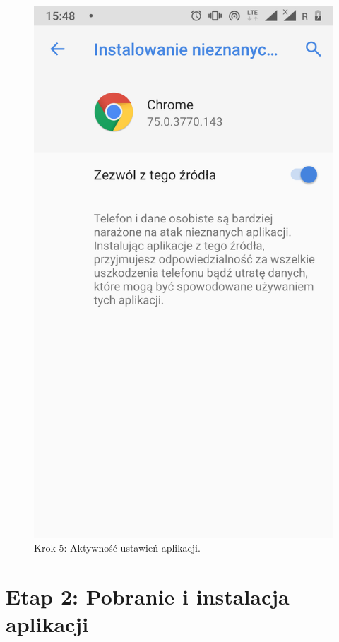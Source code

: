 \begin{enumerate}
	\begin{figure}[H]
		\centering
		\includegraphics[scale=0.14]{dodatekA/1_5.png}
		\caption{Krok 5: Aktywność ustawień aplikacji.}
	\end{figure}
	
\end{enumerate}
\clearpage 


\section{Etap 2: Pobranie i instalacja aplikacji}
\label{sec:pobranieIInstalacjaAplikacji}

